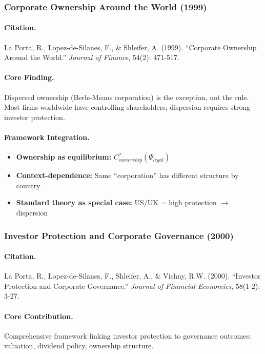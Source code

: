 \subsubsection{Corporate Ownership Around the World (1999)}

\paragraph{Citation.}
La Porta, R., Lopez-de-Silanes, F., \& Shleifer, A. (1999).
``Corporate Ownership Around the World.'' \emph{Journal of Finance}, 54(2): 471-517.

\paragraph{Core Finding.}
Dispersed ownership (Berle-Means corporation) is the exception, not the rule.
Most firms worldwide have controlling shareholders; dispersion requires
strong investor protection.

\paragraph{Framework Integration.}
\begin{itemize}
  \item \textbf{Ownership as equilibrium:} $C^*_{ownership}(\Psi_{legal})$
  \item \textbf{Context-dependence:} Same ``corporation'' has different structure by country
  \item \textbf{Standard theory as special case:} US/UK = high protection $\to$ dispersion
\end{itemize}

\subsubsection{Investor Protection and Corporate Governance (2000)}

\paragraph{Citation.}
La Porta, R., Lopez-de-Silanes, F., Shleifer, A., \& Vishny, R.W. (2000).
``Investor Protection and Corporate Governance.''
\emph{Journal of Financial Economics}, 58(1-2): 3-27.

\paragraph{Core Contribution.}
Comprehensive framework linking investor protection to governance outcomes:
valuation, dividend policy, ownership structure.

